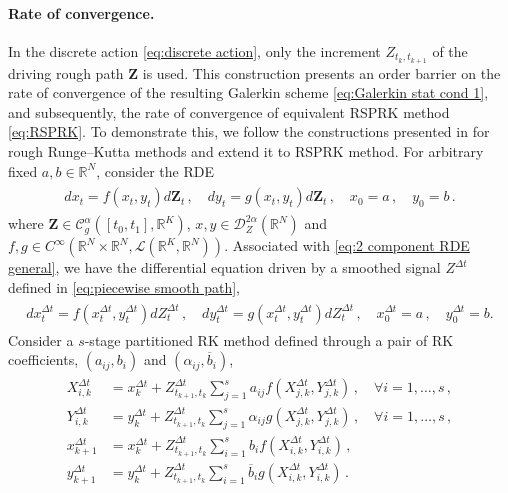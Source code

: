 \documentclass[11pt, oneside]{article}
\numberwithin{equation}{section}
\theoremstyle{definition}
\newcommand{\ob}[1]{\overline{#1}}
\newcommand{\mc}[1]{\mathcal{#1}}
\newcommand{\mcal}[1]{\mc{#1}}
\begin{document}
\paragraph{Rate of convergence.}\label{subsec:convergence}
In the discrete action \eqref{eq:discrete action}, only the increment $ Z_{t_k, t_{k+1}}$ of the driving rough path $\mathbf{Z}$ is used. This construction presents an order barrier on the rate of convergence of the resulting Galerkin scheme \eqref{eq:Galerkin stat cond 1}, and subsequently, the rate of convergence of equivalent RSPRK method \eqref{eq:RSPRK}. To demonstrate this, we follow the constructions presented in \cite{RR2020} for rough Runge--Kutta methods and extend it to RSPRK method. For arbitrary fixed $a,b \in \mathbb{R}^N$, consider the RDE
\begin{align}
    \begin{split}
        dx_t = f(x_t, y_t)d\mathbf{Z}_t\,,\quad dy_t = g(x_t, y_t)d\mathbf{Z}_t\,, \quad x_0 = a\,,\quad y_0 = b\,.
    \end{split}\label{eq:2 component RDE general}
\end{align}
where $\mathbf{Z}\in \mcal{C}^\alpha_g([t_0, t_1],\mathbb{R}^K)$, $x, y \in \mcal{D}_Z^{2\alpha}(\mathbb{R}^N)$ and $f, g \in C^\infty(\mathbb{R}^N\times \mathbb{R}^N, \mcal{L}(\mathbb{R}^K,\mathbb{R}^N))$. Associated with \eqref{eq:2 component RDE general}, we have the differential equation driven by a smoothed signal $Z^{\Delta t}$ defined in \eqref{eq:piecewise smooth path},
\begin{align}
    \begin{split}
        dx^{\Delta t}_t = f(x^{\Delta t}_t, y^{\Delta t}_t)dZ^{\Delta t}_t\,,\quad dy^{\Delta t}_t = g(x^{\Delta t}_t, y^{\Delta t}_t)d Z^{\Delta t}_t\,, \quad x^{\Delta t}_0 = a\,,\quad y^{\Delta t}_0 = b.
    \end{split}\label{eq:2 component smooth ODE general}
\end{align}
Consider a $s$-stage partitioned RK method defined through a pair of RK coefficients, $(a_{ij}, b_i)$ and $(\alpha_{ij}, \ob{b}_i)$,
\begin{align}
    \begin{split}
    X^{\Delta t}_{i,k} &= x^{\Delta t}_k + Z^{\Delta t}_{t_{k+1}, {t_k}}\sum_{j=1}^s a_{ij} f(X^{\Delta t}_{j,k}, Y^{\Delta t}_{j,k})\,,\quad \forall i = 1,\ldots,s\,,\\
    Y^{\Delta t}_{i,k} &= y^{\Delta t}_k + Z^{\Delta t}_{t_{k+1}, {t_k}}\sum_{j=1}^s \alpha_{ij} g(X^{\Delta t}_{j,k}, Y^{\Delta t}_{j,k})\,,\quad \forall i = 1,\ldots,s\,,\\
    x^{\Delta t}_{k+1} &= x^{\Delta t}_k + Z^{\Delta t}_{t_{k+1}, {t_k}}\sum_{i=1}^s b_i f(X^{\Delta t}_{i,k}, Y^{\Delta t}_{i,k})\,,\\
    y^{\Delta t}_{k+1} &= y^{\Delta t}_k + Z^{\Delta t}_{t_{k+1}, {t_k}}\sum_{i=1}^s \ob{b}_i g(X^{\Delta t}_{i,k}, Y^{\Delta t}_{i,k})\,.
    \end{split} \label{eq:PRK general}
\end{align}
\end{document}
